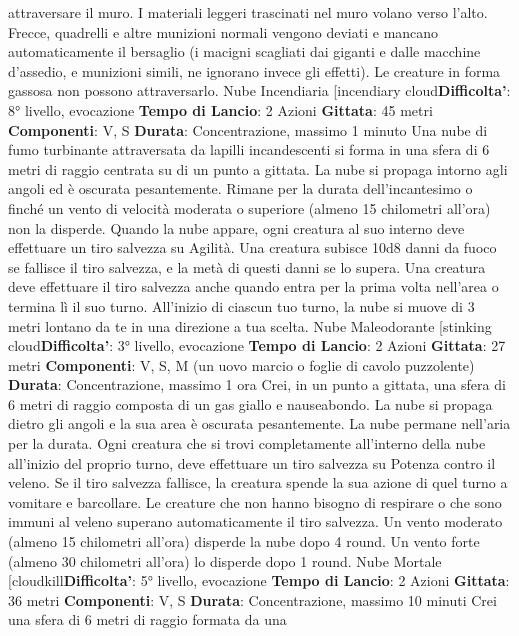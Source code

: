 \begin{multicols}{2}
attraversare il muro. I materiali leggeri trascinati nel
muro volano verso l’alto. Frecce, quadrelli e altre
munizioni normali vengono deviati e mancano
automaticamente il bersaglio (i macigni scagliati dai
giganti e dalle macchine d’assedio, e munizioni simili,
ne ignorano invece gli effetti). Le creature in forma
gassosa non possono attraversarlo.
Nube Incendiaria
[incendiary cloud\textbf{Difficolta'}:
8° livello, evocazione
\textbf{Tempo di Lancio}: 2 Azioni
\textbf{Gittata}: 45 metri
\textbf{Componenti}: V, S
\textbf{Durata}: Concentrazione, massimo 1 minuto
Una nube di fumo turbinante attraversata da lapilli
incandescenti si forma in una sfera di 6 metri di raggio
centrata su di un punto a gittata. La nube si propaga
intorno agli angoli ed è oscurata pesantemente. Rimane
per la durata dell’incantesimo o finché un vento di
velocità moderata o superiore (almeno 15 chilometri
all’ora) non la disperde.
Quando la nube appare, ogni creatura al suo interno
deve effettuare un tiro salvezza su Agilità. Una
creatura subisce 10d8 danni da fuoco se fallisce il tiro
salvezza, e la metà di questi danni se lo supera. Una
creatura deve effettuare il tiro salvezza anche quando
entra per la prima volta nell’area o termina lì il suo
turno.
All’inizio di ciascun tuo turno, la nube si muove di 3
metri lontano da te in una direzione a tua scelta.
Nube Maleodorante
[stinking cloud\textbf{Difficolta'}:
3° livello, evocazione
\textbf{Tempo di Lancio}: 2 Azioni
\textbf{Gittata}: 27 metri
\textbf{Componenti}: V, S, M (un uovo marcio o foglie di
cavolo puzzolente)
\textbf{Durata}: Concentrazione, massimo 1 ora
Crei, in un punto a gittata, una sfera di 6 metri di raggio
composta di un gas giallo e nauseabondo. La nube si
propaga dietro gli angoli e la sua area è oscurata
pesantemente. La nube permane nell’aria per la durata.
Ogni creatura che si trovi completamente all’interno
della nube all’inizio del proprio turno, deve effettuare un
tiro salvezza su Potenza contro il veleno. Se il tiro
salvezza fallisce, la creatura spende la sua azione di
quel turno a vomitare e barcollare. Le creature che non
hanno bisogno di respirare o che sono immuni al veleno
superano automaticamente il tiro salvezza.
Un vento moderato (almeno 15 chilometri all’ora)
disperde la nube dopo 4 round. Un vento forte (almeno
30 chilometri all’ora) lo disperde dopo 1 round.
Nube Mortale
[cloudkill\textbf{Difficolta'}:
5° livello, evocazione
\textbf{Tempo di Lancio}: 2 Azioni
\textbf{Gittata}: 36 metri
\textbf{Componenti}: V, S
\textbf{Durata}: Concentrazione, massimo 10 minuti
Crei una sfera di 6 metri di raggio formata da una

\end{multicols}
